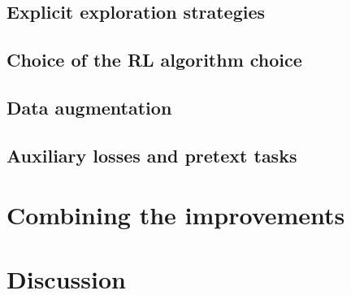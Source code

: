 \documentclass[twoside,11pt]{article}
\begin{document}
\subsection{Explicit exploration strategies}

\subsection{Choice of the RL algorithm choice}

\subsection{Data augmentation}

\subsection{Auxiliary losses and pretext tasks}

\section{Combining the improvements}

\section{Discussion}

\vskip 0.2in

\end{document}

